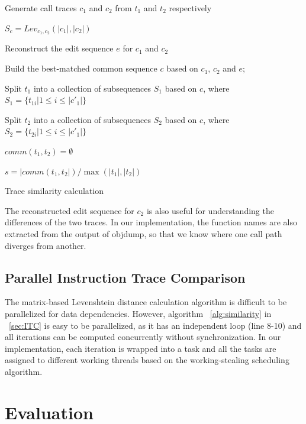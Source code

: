 \documentclass[10pt,journal,cspaper,compsoc]{IEEEtran}
\begin{document}
\begin{algorithm}[H]



Generate call traces $c_1$ and $c_2$ from $t_1$ and $t_2$
respectively\;

$S_c=Lev_{c_1,c_2}(|c_1|,|c_2|)$\;

Reconstruct the edit sequence $e$ for $c_1$ and $c_2$\;

Build the best-matched common sequence $c$ based on $c_1$, $c_2$ and
$e$;

Split $t_1$ into a collection of subsequences $S_1$ based on $c$,
where $S_1=\{t_{1i}|1\leq i \leq |c'_1|\}$\;

Split $t_2$ into a collection of subsequences $S_2$ based on $c$,
where $S_2=\{t_{2i}|1\leq i \leq |c'_1|\}$ \;

$comm(t_1, t_2)=\emptyset$\;


$s={|comm(t_1, t_2|)}/{\max{(|t_1|,|t_{2}|)}}$\;

\caption{Trace similarity calculation} \label{alg:similarity}
\end{algorithm}

The reconstructed edit sequence for $c_2$ is also useful
for understanding the differences of the two traces. In our
implementation, the function names are also extracted from the
output of objdump, so that we know where one call path
diverges from another.

\subsection{Parallel Instruction Trace Comparison}
The matrix-based Levenshtein distance calculation algorithm is
difficult to be parallelized for data dependencies. However,
algorithm ~\ref{alg:similarity} in ~\ref{sec:ITC} is easy
to be parallelized, as it has an independent loop (line 8-10) and
all iterations can be computed concurrently without synchronization.
In our implementation, each iteration is wrapped into a task and all the tasks are assigned
to different working threads based on the working-stealing scheduling algorithm.

\section{Evaluation}
\end{document}
